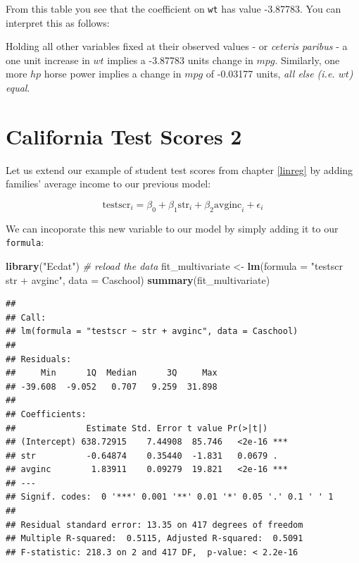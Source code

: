 \documentclass[]{book}
\newenvironment{Shaded}{\begin{snugshade}}{\end{snugshade}}
\newcommand{\KeywordTok}[1]{\textcolor[rgb]{0.13,0.29,0.53}{\textbf{#1}}}
\newcommand{\DataTypeTok}[1]{\textcolor[rgb]{0.13,0.29,0.53}{#1}}
\newcommand{\StringTok}[1]{\textcolor[rgb]{0.31,0.60,0.02}{#1}}
\newcommand{\CommentTok}[1]{\textcolor[rgb]{0.56,0.35,0.01}{\textit{#1}}}
\newcommand{\NormalTok}[1]{#1}
\newenvironment{warning}{\begin{tcolorbox}[colback=orange!5!white,colframe=orange,title=\textbf{Warning!}]}{\end{tcolorbox}}
\theoremstyle{definition}
\theoremstyle{definition}
\theoremstyle{definition}
\theoremstyle{remark}
\begin{document}
From this table you see that the coefficient on \texttt{wt} has value
-3.87783. You can interpret this as follows:

\begin{warning}
Holding all other variables fixed at their observed values - or
\emph{ceteris paribus} - a one unit increase in \(wt\) implies a
-3.87783 units change in \(mpg\). Similarly, one more \(hp\) horse power
implies a change in \(mpg\) of -0.03177 units, \emph{all else (i.e.
\(wt\)) equal}.
\end{warning}

\section{California Test Scores 2}\label{california-test-scores-2}

Let us extend our example of student test scores from chapter
\ref{linreg} by adding families' average income to our previous model:

\[
\text{testscr}_i = \beta_0 + \beta_1  \text{str}_i + \beta_2  \text{avginc}_i + \epsilon_i
\]

We can incoporate this new variable to our model by simply adding it to
our \texttt{formula}:

\begin{Shaded}
\begin{Highlighting}[]
\KeywordTok{library}\NormalTok{(}\StringTok{"Ecdat"}\NormalTok{) }\CommentTok{# reload the data}
\NormalTok{fit_multivariate <-}\StringTok{ }\KeywordTok{lm}\NormalTok{(}\DataTypeTok{formula =} \StringTok{"testscr ~ str + avginc"}\NormalTok{, }\DataTypeTok{data =}\NormalTok{ Caschool)}
\KeywordTok{summary}\NormalTok{(fit_multivariate)}
\end{Highlighting}
\end{Shaded}

\begin{verbatim}
## 
## Call:
## lm(formula = "testscr ~ str + avginc", data = Caschool)
## 
## Residuals:
##     Min      1Q  Median      3Q     Max 
## -39.608  -9.052   0.707   9.259  31.898 
## 
## Coefficients:
##              Estimate Std. Error t value Pr(>|t|)    
## (Intercept) 638.72915    7.44908  85.746   <2e-16 ***
## str          -0.64874    0.35440  -1.831   0.0679 .  
## avginc        1.83911    0.09279  19.821   <2e-16 ***
## ---
## Signif. codes:  0 '***' 0.001 '**' 0.01 '*' 0.05 '.' 0.1 ' ' 1
## 
## Residual standard error: 13.35 on 417 degrees of freedom
## Multiple R-squared:  0.5115, Adjusted R-squared:  0.5091 
## F-statistic: 218.3 on 2 and 417 DF,  p-value: < 2.2e-16
\end{verbatim}
\end{document}
